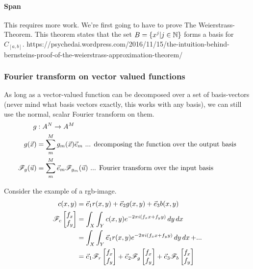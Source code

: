 \paragraph{Span} This  requires more work.  We're first going to have to prove The Weierstrass-Theorem.
This theorem states that the set $B = \{ x^j | j \in \mathbb{N} \}$ forms a basis for $C_{[a,b]}$.
https://psychedai.wordpress.com/2016/11/15/the-intuition-behind-bernsteins-proof-of-the-weierstrass-approximation-theorem/


\subsubsection{Fourier transform on vector valued functions}
As long as a vector-valued function can be decomposed over a set of basis-vectors
(never mind what basis vectors exactly, this works with any basis),
we can still use the normal, scalar Fourier transform on them. 
\begin{equation}
    \begin{split}
        g &: A^N \to A^M \\
        g(\vec{x}) &= \sum_m^M g_m(\vec{x}) \vec{e}_m \text{ ... decomposing the function over the output basis} \\
        \mathscr{F}_g(\vec{u}) &= \sum_m^M \vec{e}_m \mathscr{F}_{g_m}(\vec{u})  \text{ ... Fourier transform over the input basis}
    \end{split}
\end{equation}

Consider the example of a rgb-image.
\begin{equation}
    \begin{split}
        c(x,y) &= \vec{e}_1 r(x,y) + \vec{e}_2 g(x,y) + \vec{e}_3 b(x,y) \\
        \mathscr{F}_c\begin{bmatrix} f_x \\ f_y \end{bmatrix} 
                        &= \int_X \int_Y c(x,y) e^{-2\pi i (f_xx + f_yy)} \mathop{dy} \mathop{dx} \\
                        &= \int_X \int_Y \vec{e}_1 r(x,y) e^{-2\pi i (f_xx + f_yy)} \mathop{dy} \mathop{dx} + ... \\
                        &= \vec{e}_1 \mathscr{F}_r\begin{bmatrix} f_x \\ f_y \end{bmatrix} + \vec{e}_2 \mathscr{F}_g\begin{bmatrix} f_x \\ f_y \end{bmatrix} + \vec{e}_3 \mathscr{F}_b\begin{bmatrix} f_x \\ f_y \end{bmatrix} 
    \end{split}
\end{equation}

